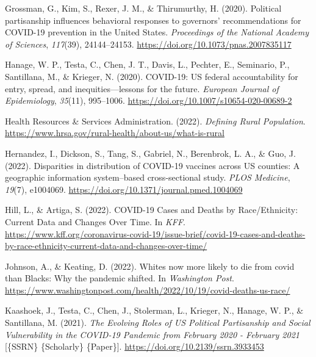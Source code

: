 \documentclass[
]{article}
\newlength{\cslhangindent}
\newlength{\cslentryspacingunit} %
\newenvironment{CSLReferences}[2] %
 {%
  \setlength{\parindent}{0pt}
  \ifodd #1
  \let\oldpar\par
  \def\par{\hangindent=\cslhangindent\oldpar}
  \fi
  \setlength{\parskip}{#2\cslentryspacingunit}
 }%
 {}
\begin{document}
\begin{CSLReferences}{1}{0}
\leavevmode{}%
Grossman, G., Kim, S., Rexer, J. M., \& Thirumurthy, H. (2020). Political partisanship influences behavioral responses to governors' recommendations for {COVID}-19 prevention in the {United} {States}. \emph{Proceedings of the National Academy of Sciences}, \emph{117}(39), 24144--24153. \url{https://doi.org/10.1073/pnas.2007835117}

\leavevmode{}%
Hanage, W. P., Testa, C., Chen, J. T., Davis, L., Pechter, E., Seminario, P., Santillana, M., \& Krieger, N. (2020). {COVID}-19: {US} federal accountability for entry, spread, and inequities---lessons for the future. \emph{European Journal of Epidemiology}, \emph{35}(11), 995--1006. \url{https://doi.org/10.1007/s10654-020-00689-2}

\leavevmode{}%
Health Resources \& Services Administration. (2022). \emph{Defining {Rural} {Population}}. \url{https://www.hrsa.gov/rural-health/about-us/what-is-rural}

\leavevmode{}%
Hernandez, I., Dickson, S., Tang, S., Gabriel, N., Berenbrok, L. A., \& Guo, J. (2022). Disparities in distribution of {COVID}-19 vaccines across {US} counties: {A} geographic information system--based cross-sectional study. \emph{PLOS Medicine}, \emph{19}(7), e1004069. \url{https://doi.org/10.1371/journal.pmed.1004069}

\leavevmode{}%
Hill, L., \& Artiga, S. (2022). {COVID}-19 {Cases} and {Deaths} by {Race}/{Ethnicity}: {Current} {Data} and {Changes} {Over} {Time}. In \emph{KFF}. \url{https://www.kff.org/coronavirus-covid-19/issue-brief/covid-19-cases-and-deaths-by-race-ethnicity-current-data-and-changes-over-time/}

\leavevmode{}%
Johnson, A., \& Keating, D. (2022). Whites now more likely to die from covid than {Blacks}: {Why} the pandemic shifted. In \emph{Washington Post}. \url{https://www.washingtonpost.com/health/2022/10/19/covid-deaths-us-race/}

\leavevmode{}%
Kaashoek, J., Testa, C., Chen, J., Stolerman, L., Krieger, N., Hanage, W. P., \& Santillana, M. (2021). \emph{The {Evolving} {Roles} of {US} {Political} {Partisanship} and {Social} {Vulnerability} in the {COVID}-19 {Pandemic} from {February} 2020 - {February} 2021} {[}\{SSRN\} \{Scholarly\} \{Paper\}{]}. \url{https://doi.org/10.2139/ssrn.3933453}


\end{CSLReferences}
\end{document}

